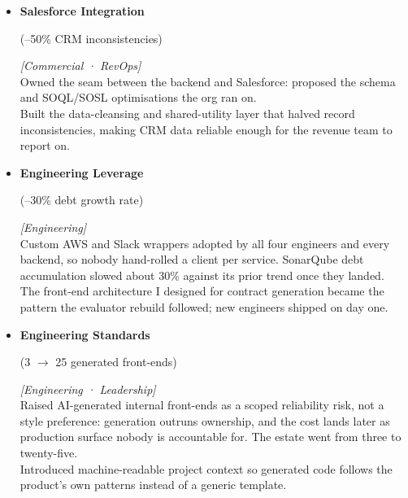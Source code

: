 \documentclass[11pt,a4paper,sans]{moderncv}
\newcommand{\impact}[1]{{\color{slate}\small #1}}
\newcommand{\impactnext}[1]{\\[0.4em]\impact{#1}}
\newcommand{\metric}[1]{%
  \begingroup
  \setlength{\fboxsep}{2pt}%
  \colorbox{whisper}{\color{navy}\bfseries\strut #1}%
  \endgroup
}
\newcommand{\stakeholders}[1]{{\color{azure}\footnotesize\textsf{\textit{[#1]}}}}
\newcommand{\rolebold}[1]{{\color{navy}\bfseries #1}}
\begin{document}
{\begin{itemize}
      \impactnext{Review errors down 90\%, request-to-approval turnaround down 40\%. Load-tested at fifteen times daily volume in an hour; the ceiling was the provider's rate limit, not the pipeline --- the hundredfold planned for is a quota change, not a rebuild.}
    \item \rolebold{Salesforce Integration} \metric{(--50\% CRM inconsistencies)} \stakeholders{Commercial · RevOps}\\
      \impact{Owned the seam between the backend and Salesforce: proposed the schema and SOQL/SOSL optimisations the org ran on.}
      \impactnext{Built the data-cleansing and shared-utility layer that halved record inconsistencies, making CRM data reliable enough for the revenue team to report on.}
    \item \rolebold{Engineering Leverage} \metric{(--30\% debt growth rate)} \stakeholders{Engineering}\\
      \impact{Custom AWS and Slack wrappers adopted by all four engineers and every backend, so nobody hand-rolled a client per service. SonarQube debt accumulation slowed about 30\% against its prior trend once they landed.}
      \impactnext{The front-end architecture I designed for contract generation became the pattern the evaluator rebuild followed; new engineers shipped on day one.}
    \item \rolebold{Engineering Standards} \metric{(3 $\rightarrow$ 25 generated front-ends)} \stakeholders{Engineering · Leadership}\\
      \impact{Raised AI-generated internal front-ends as a scoped reliability risk, not a style preference: generation outruns ownership, and the cost lands later as production surface nobody is accountable for. The estate went from three to twenty-five.}
      \impactnext{Introduced machine-readable project context so generated code follows the product's own patterns instead of a generic template.}
  \end{itemize}
}
\end{document}
